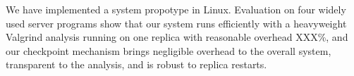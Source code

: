 We have implemented a \xxx system propotype in Linux. Evaluation on four widely 
used server programs show that our system runs efficiently with a heavyweight 
Valgrind analysis running on one replica with reasonable overhead XXX\%, and 
our checkpoint mechanism brings negligible overhead to the overall system, 
transparent to the analysis, and is robust to replica restarts.





% 

